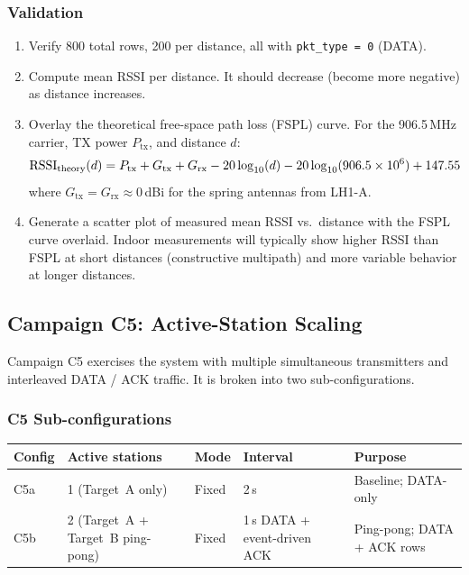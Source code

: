 \documentclass[11pt,letterpaper]{article}
\begin{document}
\subsubsection{Validation}
\begin{enumerate}[leftmargin=2em]
	\item Verify 800 total rows, 200 per distance, all with \texttt{pkt\_type = 0} (DATA).
	\item Compute mean \mbox{RSSI} per distance. It should decrease (become more negative) as distance increases.
	\item Overlay the theoretical free-space path loss (\mbox{FSPL}) curve. For the 906.5\,MHz carrier, TX power $P_{\text{tx}}$, and distance $d$:
	\[
		\text{\mbox{RSSI}}_{\text{theory}}(d) = P_{\text{tx}} + G_{\text{tx}} + G_{\text{rx}} - 20\log_{10}(d) - 20\log_{10}(906.5 \times 10^6) + 147.55
	\]
	where $G_{\text{tx}} = G_{\text{rx}} \approx 0$\,dBi for the spring antennas from LH1-A.
	\item Generate a scatter plot of measured mean \mbox{RSSI} vs.\ distance with the \mbox{FSPL} curve overlaid. Indoor measurements will typically show higher \mbox{RSSI} than \mbox{FSPL} at short distances (constructive multipath) and more variable behavior at longer distances.
\end{enumerate}


\newpage
\subsection{Campaign C5: Active-Station Scaling}

Campaign C5 exercises the system with multiple simultaneous transmitters and interleaved DATA / ACK traffic. It is broken into two sub-configurations.

\subsubsection{C5 Sub-configurations}
\begin{table}[h!]
	\centering
	\renewcommand{\arraystretch}{1.3}
	\begin{tabular}{l p{3.8cm} l p{4cm} p{3cm}}
		\toprule
		\textbf{Config} & \textbf{Active stations} & \textbf{Mode} & \textbf{Interval} & \textbf{Purpose} \\
		\midrule
		C5a & 1 (Target~A only)                 & Fixed & 2\,s                         & Baseline; DATA-only \\
		C5b & 2 (Target~A + Target~B ping-pong) & Fixed & 1\,s DATA + event-driven ACK & Ping-pong; DATA + ACK rows \\
		\bottomrule
	\end{tabular}
\end{table}
\end{document}
